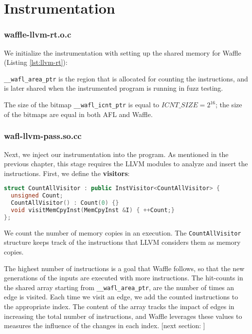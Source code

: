 \section{Instrumentation}
\label{sec:3-instr}

\subsubsection*{waffle-llvm-rt.o.c}

We initialize the instrumentation with setting up the shared memory for Waffle (Listing \ref{lst:llvm-rt}):



\texttt{\_\_wafl\_area\_ptr} is the region that is allocated for counting the instructions, and is later shared when the instrumented program is running in fuzz testing.

The size of the bitmap \texttt{\_\_wafl\_icnt\_ptr} is equal to $ICNT\_SIZE=2^{16}$; the size of the bitmaps are equal in both AFL and Waffle.

\subsubsection*{wafl-llvm-pass.so.cc}

Next, we inject our instrumentation into the program. As mentioned in the previous chapter, this stage requires the LLVM modules to analyze and insert the instructions. First, we define the \textbf{visitors}:

\begin{lstlisting}[language=C++,style=CodeStyle,label={lst:wfl-vis}]
struct CountAllVisitor : public InstVisitor<CountAllVisitor> {
  unsigned Count;
  CountAllVisitor() : Count(0) {}
  void visitMemCpyInst(MemCpyInst &I) { ++Count;}
};
\end{lstlisting}

We count the number of memory copies in an execution. The \texttt{CountAll\-Visitor} structure keeps track of the instructions that LLVM considers them as memory copies.

The highest number of instructions is a goal that Waffle follows, so that the new generations of the inputs are executed with more instructions. The hit-counts in the shared array starting from \texttt{\_\_wafl\_area\_ptr}, are the number of times an edge is visited. Each time we visit an edge, we add the counted instructions to the appropriate index. The content of the array tracks the impact of edges in increasing the total number of instructions, and Waffle leverages these values to measures the influence of the changes in each index. [next section: ]

